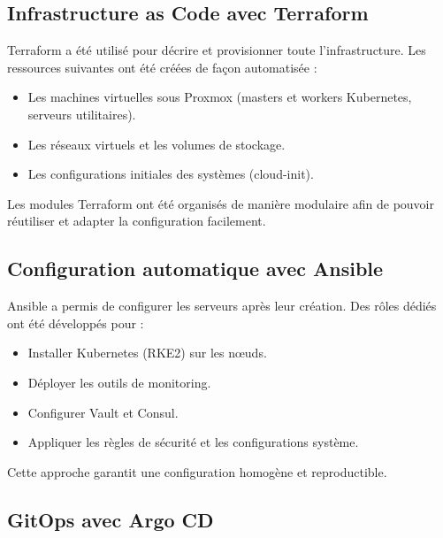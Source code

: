 
\subsection{Infrastructure as Code avec Terraform}

Terraform a été utilisé pour décrire et provisionner toute l'infrastructure. Les ressources suivantes ont été créées de façon automatisée :

\begin{itemize}
  \item Les machines virtuelles sous Proxmox (masters et workers Kubernetes, serveurs utilitaires).
  \item Les réseaux virtuels et les volumes de stockage.
  \item Les configurations initiales des systèmes (cloud-init).
\end{itemize}

Les modules Terraform ont été organisés de manière modulaire afin de pouvoir réutiliser et adapter la configuration facilement.

\subsection{Configuration automatique avec Ansible}

Ansible a permis de configurer les serveurs après leur création. Des rôles dédiés ont été développés pour :

\begin{itemize}
  \item Installer Kubernetes (RKE2) sur les nœuds.
  \item Déployer les outils de monitoring.
  \item Configurer Vault et Consul.
  \item Appliquer les règles de sécurité et les configurations système.
\end{itemize}

Cette approche garantit une configuration homogène et reproductible.

\subsection{GitOps avec Argo CD}

